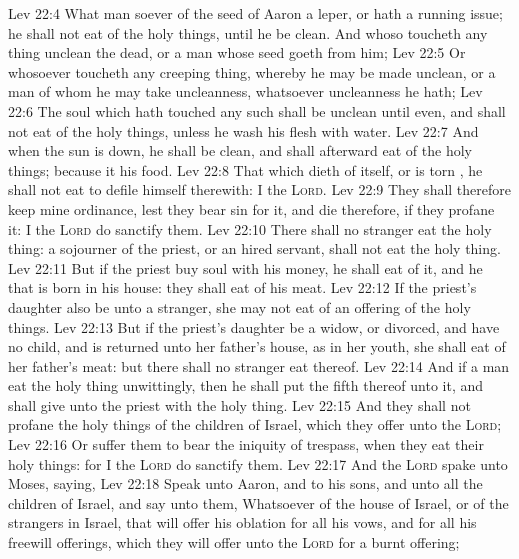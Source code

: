 \vs Lev 22:4 What man soever of the seed of Aaron  a leper, or hath a running issue; he shall not eat of the holy things, until he be clean. And whoso toucheth any thing  unclean  the dead, or a man whose seed goeth from him;
\vs Lev 22:5 Or whosoever toucheth any creeping thing, whereby he may be made unclean, or a man of whom he may take uncleanness, whatsoever uncleanness he hath;
\vs Lev 22:6 The soul which hath touched any such shall be unclean until even, and shall not eat of the holy things, unless he wash his flesh with water.
\vs Lev 22:7 And when the sun is down, he shall be clean, and shall afterward eat of the holy things; because it  his food.
\vs Lev 22:8 That which dieth of itself, or is torn , he shall not eat to defile himself therewith: I  the \textsc{Lord}.
\vs Lev 22:9 They shall therefore keep mine ordinance, lest they bear sin for it, and die therefore, if they profane it: I the \textsc{Lord} do sanctify them.
\vs Lev 22:10 There shall no stranger eat  the holy thing: a sojourner of the priest, or an hired servant, shall not eat  the holy thing.
\vs Lev 22:11 But if the priest buy  soul with his money, he shall eat of it, and he that is born in his house: they shall eat of his meat.
\vs Lev 22:12 If the priest's daughter also be  unto a stranger, she may not eat of an offering of the holy things.
\vs Lev 22:13 But if the priest's daughter be a widow, or divorced, and have no child, and is returned unto her father's house, as in her youth, she shall eat of her father's meat: but there shall no stranger eat thereof.
\vs Lev 22:14 And if a man eat  the holy thing unwittingly, then he shall put the fifth  thereof unto it, and shall give  unto the priest with the holy thing.
\vs Lev 22:15 And they shall not profane the holy things of the children of Israel, which they offer unto the \textsc{Lord};
\vs Lev 22:16 Or suffer them to bear the iniquity of trespass, when they eat their holy things: for I the \textsc{Lord} do sanctify them.
\vs Lev 22:17 And the \textsc{Lord} spake unto Moses, saying,
\vs Lev 22:18 Speak unto Aaron, and to his sons, and unto all the children of Israel, and say unto them, Whatsoever  of the house of Israel, or of the strangers in Israel, that will offer his oblation for all his vows, and for all his freewill offerings, which they will offer unto the \textsc{Lord} for a burnt offering;
